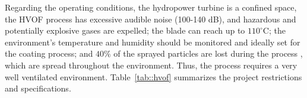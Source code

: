 
Regarding the operating conditions, the hydropower turbine is a confined
space, the HVOF process has excessive audible noise (100-140 dB), and hazardous
and potentially explosive gases are expelled; the blade can reach up to
$110^\circ$C; the environment's temperature and humidity should be monitored and
ideally set for the coating process; and $40\%$ of the sprayed particles are
lost during the process \citep{wu2006rebound}, which are spread throughout
the environment. Thus, the process requires a very well
ventilated environment. Table~\ref{tab::hvof} summarizes the project
restrictions and specifications.



